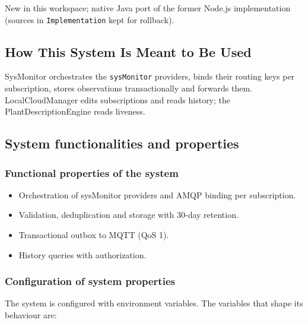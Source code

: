\documentclass[a4paper]{arrowhead}
\begin{document}
New in this workspace; native Java port of the former Node.js implementation (sources in \texttt{Implementation} kept for rollback).

\subsection{How This System Is Meant to Be Used}
\label{sec:use}

SysMonitor orchestrates the \texttt{sysMonitor} providers, binds their routing keys per subscription, stores observations transactionally and forwards them. LocalCloudManager edits subscriptions and reads history; the Plant\allowbreak{}Description\allowbreak{}Engine reads liveness.

\subsection{System functionalities and properties}
\label{sec:properties}

\subsubsection{Functional properties of the system}

\begin{itemize}
  \item Orchestration of sysMonitor providers and AMQP binding per subscription.
  \item Validation, deduplication and storage with 30-day retention.
  \item Transactional outbox to MQTT (QoS 1).
  \item History queries with authorization.
\end{itemize}

\subsubsection{Configuration of system properties}

The system is configured with environment variables. The variables that shape its behaviour are:
\end{document}
